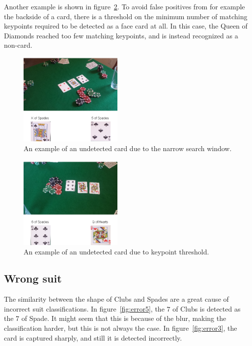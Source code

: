 \documentclass[journal,twoside]{IEEEtran}
\begin{document}
Another example is shown in figure~\ref{fig:error17}. To avoid false positives from for example the backside of a card, there is a threshold on the minimum number of matching keypoints required to be detected as a face card at all. In this case, the Queen of Diamonds reached too few matching keypoints, and is instead recognized as a non-card.

\begin{figure}[placement h]
\centering
\includegraphics[width=0.45\textwidth]{images/testResults/11.png}
\caption{An example of an undetected card due to the narrow search window.}
\label{fig:error11}
\end{figure}

\begin{figure}[placement h]
\centering
\includegraphics[width=0.45\textwidth]{images/testResults/17.png}
\caption{An example of an undetected card due to keypoint threshold.}
\label{fig:error17}
\end{figure}


\subsection{Wrong suit}

The similarity between the shape of Clubs and Spades are a great cause of incorrect suit classifications. In figure~\ref{fig:error5}, the $7$ of Clubs is detected as the $7$ of Spade. It might seem that this is because of the blur, making the classification harder, but this is not always the case. In figure~\ref{fig:error3}, the card is captured sharply, and still it is detected incorrectly.
\end{document}
